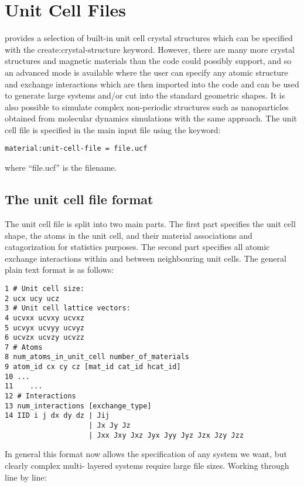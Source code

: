 \chapter{Unit Cell Files}\label{chap:unitcellfiles}
\vampire provides a selection of built-in unit cell crystal structures which can be specified with the 
create:crystal-structure keyword. However, there are many more crystal structures and magnetic materials 
than the code could possibly support, and so an advanced mode is available where the user can specify 
any atomic structure and exchange interactions which are then imported into the code and can be used to generate large systems and/or cut into the standard geometric shapes. It is also possible to simulate complex non-periodic structures such as nanoparticles obtained from molecular dynamics simulations with the same approach. The unit cell file is specified in the main input file using the keyword:
\begin{verbatim}
material:unit-cell-file = file.ucf
\end{verbatim}
where ``file.ucf'' is the filename. 

\section*{The unit cell file format}
The unit cell file is split into two main parts. The first part specifies the unit cell shape, the atoms in the unit cell, and their material associations and catagorization for statistics purposes. The second part specifies all atomic exchange interactions within and between neighbouring unit cells. The general plain text format is as follows:

\begin{verbatim}
1 # Unit cell size:
2 ucx ucy ucz
3 # Unit cell lattice vectors:
4 ucvxx ucvxy ucvxz
5 ucvyx ucvyy ucvyz
6 ucvzx ucvzy ucvzz
7 # Atoms
8 num_atoms_in_unit_cell number_of_materials
9 atom_id cx cy cz [mat_id cat_id hcat_id]
10 ...
11    ...
12 # Interactions
13 num_interactions [exchange_type] 
14 IID i j dx dy dz | Jij
                    | Jx Jy Jz
                    | Jxx Jxy Jxz Jyx Jyy Jyz Jzx Jzy Jzz
\end{verbatim}

In general this format now allows the specification of any system we want, but clearly complex multi- layered systems require large file sizes. Working through line by line:\\

